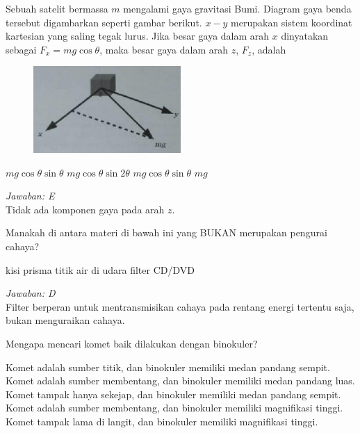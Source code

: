 \documentclass[11pt,fleqn, a4paper]{exam}
\begin{document}
\begin{questions}
\vspace{0.5cm}
\question Sebuah satelit bermassa $m$ mengalami gaya gravitasi Bumi. Diagram gaya benda tersebut digambarkan seperti gambar berikut. $x-y$ merupakan sistem koordinat kartesian yang saling tegak lurus. Jika besar gaya dalam arah $x$ dinyatakan sebagai $F_x=mg\cos \theta$, maka besar gaya dalam arah $z$, $F_z$, adalah
\begin{figure}[H]
\centering
\includegraphics[width=0.5\textwidth]{gambar/gaya.png}
\end{figure}
\begin{choices}
\choice $mg\cos \theta \sin \theta$
\choice $mg\cos \theta \sin 2\theta$
\choice $mg\cos \theta \sin \theta$
\choice $mg$
\end{choices}

\textit{Jawaban: E}\\
Tidak ada komponen gaya pada arah $z$.

\vspace{0.5cm}
\question Manakah di antara materi di bawah ini yang BUKAN merupakan pengurai cahaya?
\begin{choices}
\choice kisi
\choice prisma
\choice titik air di udara
\choice filter
\choice CD/DVD
\end{choices}

\textit{Jawaban: D}\\
Filter berperan untuk mentransmisikan cahaya pada rentang energi tertentu saja, bukan menguraikan cahaya.

\vspace{0.5cm}
\question Mengapa mencari komet baik dilakukan dengan binokuler?
\begin{choices}
\choice Komet adalah sumber titik, dan binokuler memiliki medan pandang sempit.
\choice Komet adalah sumber membentang, dan binokuler memiliki medan pandang luas.
\choice Komet tampak hanya sekejap, dan binokuler memiliki medan pandang sempit.
\choice Komet adalah sumber membentang, dan binokuler memiliki magnifikasi tinggi.
\choice Komet tampak lama di langit, dan binokuler memiliki magnifikasi tinggi.
\end{choices}


\end{questions}
\end{document}
